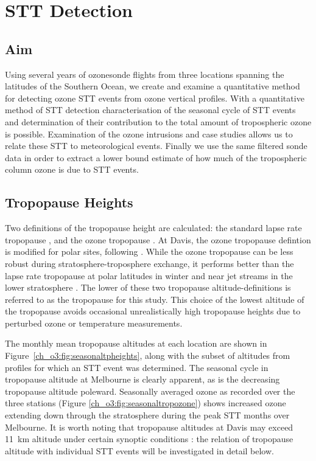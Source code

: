 \section{STT Detection}

  \subsection{Aim}
    Using several years of ozonesonde flights from three locations spanning the latitudes of the Southern Ocean, we create and examine a quantitative method for detecting ozone STT events from ozone vertical profiles.
    With a quantitative method of STT detection characterisation of the seasonal cycle of STT events and determination of their contribution to the total amount of tropospheric ozone is possible.
    Examination of the ozone intrusions and case studies allows us to relate these STT to meteorological events.
    Finally we use the same filtered sonde data in order to extract a lower bound estimate of how much of the tropospheric column ozone is due to STT events.

  \subsection{Tropopause Heights}
    Two definitions of the tropopause height are calculated: the standard lapse rate tropopause \citep{WMO1957}, and the ozone tropopause \citep{Bethan1996}.
    At Davis, the ozone tropopause defintion is modified for polar sites, following \citet{Tomikawa2009,Alexander2013}. 
    While the ozone tropopause can be less robust during stratosphere-troposphere exchange, it performs better than the lapse rate tropopause at polar latitudes in winter and near jet streams in the lower stratosphere \citep{Bethan1996}. The lower of these two tropopause altitude-definitions is referred to as the tropopause for this study.
    This choice of the lowest altitude of the tropopause avoids occasional unrealistically high tropopause heights due to perturbed ozone or temperature measurements.

    The monthly mean tropopause altitudes at each location are shown in Figure~\ref{ch_o3:fig:seasonaltpheights}, along with the subset of altitudes from profiles for which an STT event was determined. 
    The seasonal cycle in tropopause altitude at Melbourne is clearly apparent, as is the decreasing tropopause altitude poleward. 
    Seasonally averaged ozone as recorded over the three stations (Figure \ref{ch_o3:fig:seasonaltropozone}) shows increased ozone extending down through the stratosphere during the peak STT months over Melbourne.
    It is worth noting that tropopause altitudes at Davis may exceed 11~km altitude under certain synoptic conditions \citep{Alexander2013}: the relation of tropopause altitude with individual STT events will be investigated in detail below.

